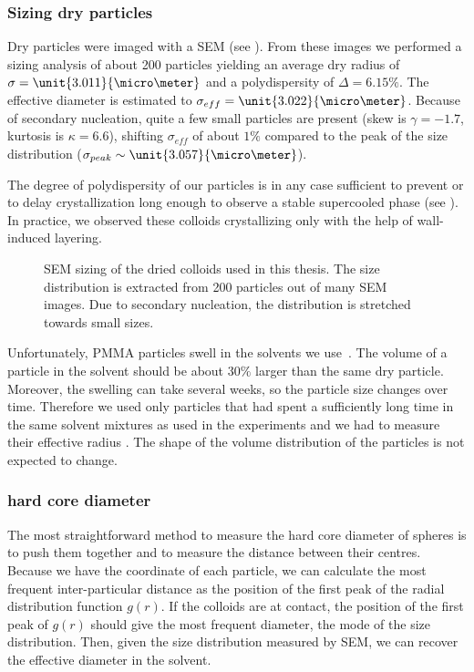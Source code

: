 \subsubsection{Sizing dry particles}
Dry particles were imaged with a \acf{SEM} (see ). From these images we performed a sizing analysis of about 200 particles yielding an average dry radius of $\sigma=\unit{3.011}{\micro\meter}$ and a polydispersity of $\Delta=6.15\%$. The effective diameter is estimated to $\sigma_{eff}=\unit{3.022}{\micro\meter}$. Because of secondary nucleation, quite a few small particles are present (skew is $\gamma=-1.7$, kurtosis is $\kappa=6.6$), shifting $\sigma_{eff}$ of about $1\%$ compared to the peak of the size distribution ($\sigma_{peak}\sim\unit{3.057}{\micro\meter}$).

The degree of polydispersity of our particles is in any case sufficient to prevent or to delay crystallization long enough to observe a stable supercooled phase (see ). In practice, we observed these colloids crystallizing only with the help of wall-induced layering.

\begin{figure}
	\centering
	\caption{\acs{SEM} sizing of the dried colloids used in this thesis. The size distribution is extracted from 200 particles out of many \acs{SEM} images. Due to secondary nucleation, the distribution is stretched towards small sizes.}
	\label{fig:SEM}
\end{figure}

Unfortunately, \ac{PMMA} particles swell in the solvents we use~\citep{bosma2002, ohtsuka2008local}. The volume of a particle in the solvent should be about $30\%$ larger than the same dry particle. Moreover, the swelling can take several weeks, so the particle size changes over time. Therefore we used only particles that had spent a sufficiently long time in the same solvent mixtures as used in the experiments and we had to measure their effective radius . The shape of the volume distribution of the particles is not expected to change.

\subsubsection{ hard core diameter}
The most straightforward method to measure the hard core diameter of spheres is to push them together and to measure the distance between their centres. Because we have the coordinate of each particle, we can calculate the most frequent inter-particular distance as the position of the first peak of the radial distribution function $g(r)$. If the colloids are at contact, the position of the first peak of $g(r)$ should give the most frequent diameter,  the mode of the size distribution. Then, given the size distribution measured by \ac{SEM}, we can recover the effective diameter in the solvent.

